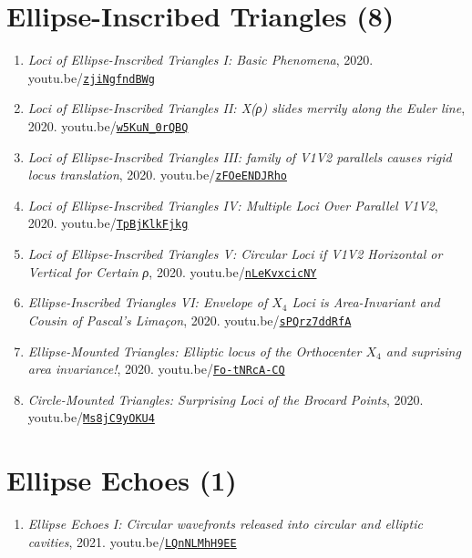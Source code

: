 \documentclass[12pt]{article}
\begin{document}
\section{Ellipse-Inscribed Triangles (8)}

\begin{enumerate}[resume]
\item \textit{Loci of Ellipse-Inscribed Triangles I: Basic Phenomena}, 2020. youtu.be/\href{https://youtu.be/zjiNgfndBWg}{\nolinkurl{zjiNgfndBWg}}
\item \textit{Loci of Ellipse-Inscribed Triangles II: X(ρ) slides merrily along the Euler line}, 2020. youtu.be/\href{https://youtu.be/w5KuN_0rQBQ}{\nolinkurl{w5KuN\_0rQBQ}}
\item \textit{Loci of Ellipse-Inscribed Triangles III: family of V1V2 parallels causes rigid locus translation}, 2020. youtu.be/\href{https://youtu.be/zFOeENDJRho}{\nolinkurl{zFOeENDJRho}}
\item \textit{Loci of Ellipse-Inscribed Triangles IV: Multiple Loci Over Parallel V1V2}, 2020. youtu.be/\href{https://youtu.be/TpBjKlkFjkg}{\nolinkurl{TpBjKlkFjkg}}
\item \textit{Loci of Ellipse-Inscribed Triangles V: Circular Loci if V1V2 Horizontal or Vertical for Certain ρ}, 2020. youtu.be/\href{https://youtu.be/nLeKvxcicNY}{\nolinkurl{nLeKvxcicNY}}
\item \textit{Ellipse-Inscribed Triangles VI: Envelope of $X_{4}$ Loci is Area-Invariant and Cousin of Pascal's Limaçon}, 2020. youtu.be/\href{https://youtu.be/sPQrz7ddRfA}{\nolinkurl{sPQrz7ddRfA}}
\item \textit{Ellipse-Mounted Triangles: Elliptic locus of the Orthocenter $X_{4}$ and suprising area invariance!}, 2020. youtu.be/\href{https://youtu.be/Fo-tNRcA-CQ}{\nolinkurl{Fo-tNRcA-CQ}}
\item \textit{Circle-Mounted Triangles: Surprising Loci of the Brocard Points}, 2020. youtu.be/\href{https://youtu.be/Ms8jC9yOKU4}{\nolinkurl{Ms8jC9yOKU4}}
\end{enumerate}

\section{Ellipse Echoes (1)}

\begin{enumerate}[resume]
\item \textit{Ellipse Echoes I: Circular wavefronts released into circular and elliptic cavities}, 2021. youtu.be/\href{https://youtu.be/LQnNLMhH9EE}{\nolinkurl{LQnNLMhH9EE}}
\end{enumerate}
\end{document}
